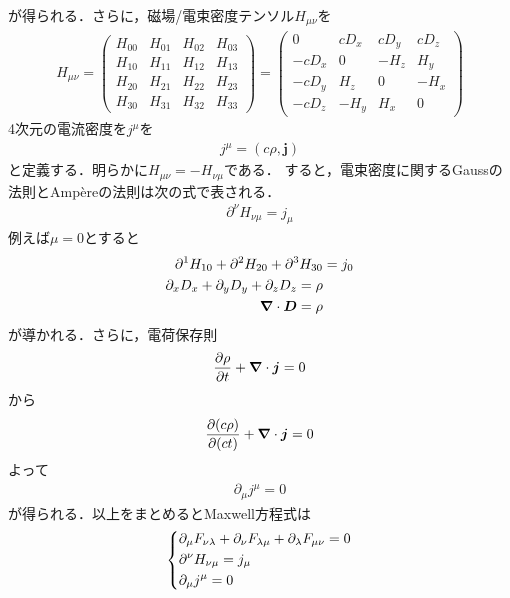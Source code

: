 \documentclass{report}
\begin{document}
  が得られる．さらに，磁場/電束密度テンソル$H_{\mu\nu}$を
  \begin{align}
    H_{\mu\nu}=
    \begin{pmatrix}
      H_{00} & H_{01} & H_{02} & H_{03}\\
      H_{10} & H_{11} & H_{12} & H_{13}\\
      H_{20} & H_{21} & H_{22} & H_{23}\\
      H_{30} & H_{31} & H_{32} & H_{33}
    \end{pmatrix}
    =
    \begin{pmatrix}
      0 & cD_x & cD_y & cD_z \\
      -cD_x & 0 & -H_z & H_y\\
      -cD_y & H_z & 0 & -H_x\\
      -cD_z& -H_y & H_x & 0
    \end{pmatrix}
  \end{align}
  4次元の電流密度を$j^{\mu}$を
  \begin{align}
    j^{\mu} = (c\rho, \bm{j})
  \end{align}
  と定義する．明らかに$H_{\mu\nu} = -H_{\nu\mu}$である．
  すると，電束密度に関するGaussの法則とAmpèreの法則は次の式で表される．
  \begin{align}
    \partial^{\nu}H_{\nu\mu}=j_\mu
  \end{align}
  例えば$\mu=0$とすると
  \begin{align}
    \partial^1H_{10}+\partial^2H_{20} + \partial^3H_{30} &= j_0\\
    \partial_xD_x + \partial_yD_y + \partial_zD_z = \rho\\
    \grad\cdot\bm{D} = \rho
  \end{align}
  が導かれる．さらに，電荷保存則
  \begin{align}
    \frac{\partial \rho}{\partial t} + \grad\cdot\bm{j} = 0
  \end{align}
  から
  \begin{align}
    \frac{\partial (c\rho)}{\partial (ct)} + \grad\cdot\bm{j} = 0
  \end{align}
  よって
  \begin{align}
    \partial_\mu j^\mu = 0
  \end{align}
  が得られる．以上をまとめるとMaxwell方程式は
  \begin{align}
    \begin{dcases}
      \partial_\mu F_{\nu\lambda} + \partial_\nu F_{\lambda\mu} + \partial_\lambda F_{\mu\nu} = 0\\
      \partial^{\nu}H_{\nu\mu}=j_\mu\\
      \partial_\mu j^\mu = 0
    \end{dcases}
  \end{align}
\end{document}
